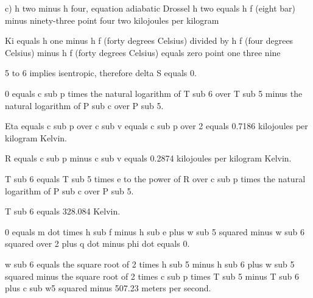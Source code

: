 c) h two minus h four, equation adiabatic Drossel  
h two equals h f (eight bar) minus ninety-three point four two kilojoules per kilogram  

Ki equals h one minus h f (forty degrees Celsius) divided by h f (four degrees Celsius) minus h f (forty degrees Celsius) equals zero point one three nine

5 to 6 implies isentropic, therefore delta S equals 0.

0 equals c sub p times the natural logarithm of T sub 6 over T sub 5 minus the natural logarithm of P sub c over P sub 5.

Eta equals c sub p over c sub v equals c sub p over 2 equals 0.7186 kilojoules per kilogram Kelvin.

R equals c sub p minus c sub v equals 0.2874 kilojoules per kilogram Kelvin.

T sub 6 equals T sub 5 times e to the power of R over c sub p times the natural logarithm of P sub c over P sub 5.

T sub 6 equals 328.084 Kelvin.

0 equals m dot times h sub f minus h sub e plus w sub 5 squared minus w sub 6 squared over 2 plus q dot minus phi dot equals 0.

w sub 6 equals the square root of 2 times h sub 5 minus h sub 6 plus w sub 5 squared minus the square root of 2 times c sub p times T sub 5 minus T sub 6 plus c sub w5 squared minus 507.23 meters per second.